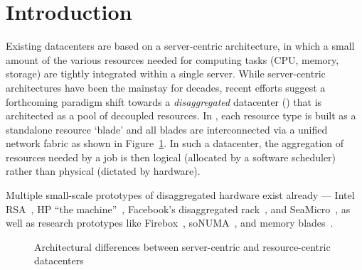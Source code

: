 \vspace{-0.1in}
\section{Introduction}
\vspace{-0.05in}
\label{sec:intro}
Existing datacenters are based on a server-centric architecture, in which a small amount of the various resources needed for computing tasks (CPU, memory, storage) are tightly integrated within a single server. While server-centric architectures have been the mainstay for decades, recent efforts suggest a forthcoming paradigm shift towards a {\em disaggregated} datacenter (\dis) that is architected as a pool of decoupled resources. In \dis, each resource type is built as a standalone resource `blade' and all blades are interconnected via a unified network fabric as shown in Figure~\ref{fig:dc}. In such a datacenter, the aggregation of resources needed by a job is then logical (allocated by a software scheduler) rather than physical (dictated by hardware).

Multiple small-scale prototypes of disaggregated hardware exist already --- Intel RSA~\cite{rsa}, HP ``the machine''~\cite{hptm}, Facebook's disaggregated rack~\cite{fdr}, and SeaMicro~\cite{seamicro}, as well as research prototypes like Firebox~\cite{firebox}, soNUMA~\cite{sonuma}, and memory blades~\cite{ddcHwDesign1}.

\begin{figure}[!t]
\centering 
{}
\hfill
{}
\caption{Architectural differences between server-centric and resource-centric datacenters}
\label{fig:dc}
\end{figure}


